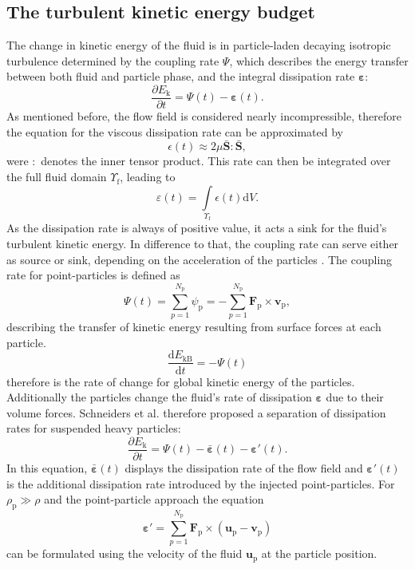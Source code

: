 \documentclass[11pt,a4paper,openany,oneside,parskip=half*]{article}
\renewcommand*\vec[1]{\boldsymbol{#1}}
\begin{document}
\subsection{The turbulent kinetic energy budget}
The change in kinetic energy of the fluid is in particle-laden decaying isotropic turbulence determined by the coupling rate $\Psi$, which describes the energy transfer between both fluid and particle phase, and the integral dissipation rate $\vec{\varepsilon}$:
\begin{equation}
\frac{\partial E_\mathrm{k}}{\partial t} = \Psi (t) - \vec{\varepsilon} (t).
\end{equation}
As mentioned before, the flow field is considered nearly incompressible, therefore the equation  for the viscous dissipation rate can be approximated by
\begin{equation}
 \epsilon (t) \approx 2 \mu \vec{\bar{S}}\vec{:}\vec{\bar{S}},
\end{equation}
were $\vec{:}$ denotes the inner tensor product. This rate can then be integrated over the full fluid domain $\Upsilon_\mathrm{f}$, leading to 
\begin{equation}
\varepsilon (t) = \int\limits_{\Upsilon_\mathrm{f}} \epsilon(t) \mathrm{d}V.
\end{equation}
As the dissipation rate is always of positive value, it acts a sink for the fluid's turbulent kinetic energy. In difference to that, the coupling rate can serve either as source or sink, depending on the acceleration of the particles \cite{mechanismsoftwowaycoupling}. The coupling rate for point-particles is defined as
\begin{equation}
\Psi (t) = \sum_{p=1}^{N_\mathrm{p}} \psi_\mathrm{p}= - \sum_{p=1}^{N_\mathrm{p}} \vec{F}_\mathrm{p} \times\vec{v}_\mathrm{p},
\end{equation}
describing the transfer of kinetic energy resulting from surface forces at each particle. 
\begin{equation}
\frac{\mathrm{d}E_\mathrm{kB}}{\mathrm{d}t} = - \Psi (t)
\end{equation}
therefore is the rate of change for global kinetic energy of the particles.
Additionally the particles change the fluid's rate of dissipation $\vec{\varepsilon}$ due to their volume forces. 
Schneiders et al. \cite{schneiders2017} therefore proposed a separation of dissipation rates for suspended heavy particles:
\begin{equation}
\frac{\partial E_\mathrm{k}}{\partial t} = \Psi (t) - \vec{\bar{\varepsilon}} (t) - \vec{\varepsilon}' (t).
\end{equation}
In this equation, $\vec{\bar{\varepsilon}} (t)$ displays the dissipation rate of the flow field and $\vec{\varepsilon}' (t)$ is the additional dissipation rate introduced by the injected point-particles. For $\rho_\mathrm{p} \gg \rho$ and the point-particle approach the equation
\begin{equation}
	\vec{\varepsilon}' = \sum_{p=1}^{N_\mathrm{p}} \vec{F}_\mathrm{p} \times (\vec{u}_\mathrm{p}-\vec{v}_\mathrm{p})
\end{equation}
can be formulated using the velocity of the fluid $\vec{u}_\mathrm{p}$ at the particle position.
\newline
\end{document}
